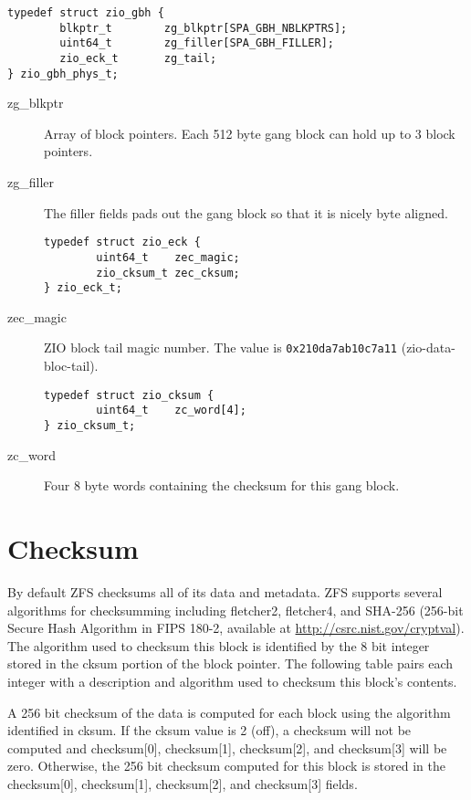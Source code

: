 \begin{lstlisting}[style=c]
typedef struct zio_gbh {
        blkptr_t		zg_blkptr[SPA_GBH_NBLKPTRS];
        uint64_t		zg_filler[SPA_GBH_FILLER];
        zio_eck_t		zg_tail;
} zio_gbh_phys_t;
\end{lstlisting}

\begin{description}
  \item[zg\_blkptr]
    Array of block pointers. Each 512 byte gang block can hold up to 3 block pointers.

  \item[zg\_filler]
    The filler fields pads out the gang block so that it is nicely byte aligned.
\begin{lstlisting}[style=c]
typedef struct zio_eck {
        uint64_t	zec_magic;
        zio_cksum_t	zec_cksum;
} zio_eck_t;
\end{lstlisting}

  \item[zec\_magic]
    ZIO block tail magic number.
    The value is \verb|0x210da7ab10c7a11| (zio-data-bloc-tail).
\begin{lstlisting}[style=c]
typedef struct zio_cksum {
        uint64_t	zc_word[4];
} zio_cksum_t;
\end{lstlisting}

  \item [zc\_word]
      Four 8 byte words containing the checksum for this gang block.
\end{description}

\section{Checksum}

By default ZFS checksums all of its data and metadata.
ZFS supports several algorithms for checksumming including fletcher2, fletcher4,
and SHA-256 (256-bit Secure Hash Algorithm in FIPS 180-2,
available at \href{http://csrc.nist.gov/cryptval}{http://csrc.nist.gov/cryptval}).
The algorithm used to checksum this block
is identified by the 8 bit integer stored in the cksum portion of the block pointer. The
following table pairs each integer with a description and algorithm
used to checksum this block's contents.

A 256 bit checksum of the data is computed for each block
using the algorithm identified in cksum.
If the cksum value is 2 (off),
a checksum will not be computed
and checksum[0], checksum[1], checksum[2], and checksum[3] will be zero.
Otherwise,
the 256 bit checksum computed for this block is stored
in the checksum[0], checksum[1], checksum[2], and checksum[3] fields.

